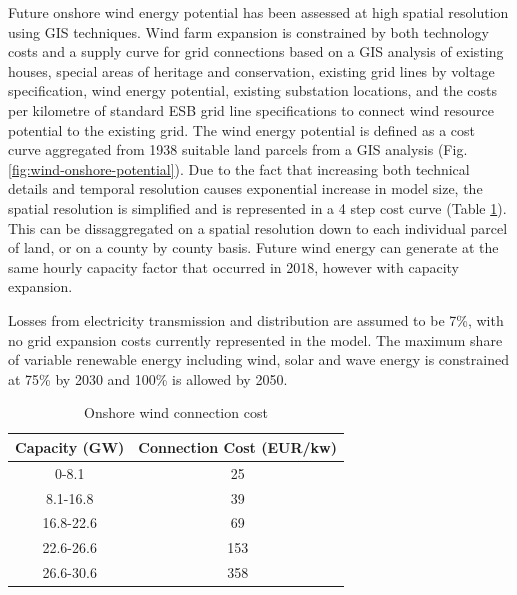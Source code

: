 \documentclass[gmd,manuscript]{copernicus}
\begin{document}
Future onshore wind energy potential has been assessed at high spatial resolution using GIS techniques. Wind farm expansion is constrained by both technology costs and a supply curve for grid connections based on a GIS analysis of existing houses, special areas of heritage and conservation, existing grid lines by voltage specification, wind energy potential, existing substation locations, and the costs per kilometre of standard ESB grid line specifications to connect wind resource potential to the existing grid. The wind energy potential is defined as a cost curve aggregated from 1938 suitable land parcels from a GIS analysis (Fig. \ref{fig:wind-onshore-potential}). Due to the fact that increasing both technical details and temporal resolution causes exponential increase in model size, the spatial resolution is simplified and is represented in a 4 step cost curve (Table \ref{onshore-wind-connection-cost}). This can be dissaggregated on a spatial resolution down to each individual parcel of land, or on a county by county basis. Future wind energy can generate at the same hourly capacity factor that occurred in 2018, however with capacity expansion.

Losses from electricity transmission and distribution are assumed to be 7\%, with no grid expansion costs currently represented in the model. The maximum share of variable renewable energy including wind, solar and wave energy is constrained at 75\% by 2030 and 100\% is allowed by 2050. 

\begin{table}[ht]
 \centering
 \footnotesize
 \caption{Onshore wind connection cost }
 \begin{tabular}{cc}
 \hline 
 Capacity (GW) & Connection Cost (EUR/kw)\\ 
 \hline
 0-8.1 & 25 \\
 
 8.1-16.8 & 39 \\
 
 16.8-22.6 & 69 \\
 
 22.6-26.6 & 153 \\
 
 26.6-30.6 & 358 \\
 
 \hline
 \end{tabular}
 
 \label{onshore-wind-connection-cost}
\end{table}
\end{document}
